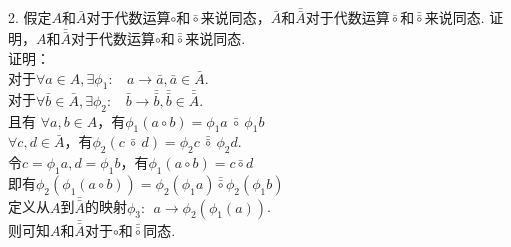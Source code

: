 \documentclass{ctexart}
\begin{document}
2. 假定$A$和$\bar{A}$对于代数运算$\circ$和$\bar{\circ}$来说同态，$\bar{A}$和$\bar{\bar{A}}$对于代数运算$\bar{\circ}$和$\bar{\bar{\circ}}$来说同态. 证明，$A$和$\bar{\bar{A}}$对于代数运算$\circ$和$\bar{\bar{\circ}}$来说同态. \\
证明：\\
对于$\forall a \in A, \exists \phi_1: \ \ \ \ a \rightarrow \bar{a}, \bar{a} \in \bar{A}.$ \\
对于$\forall \bar{b} \in \bar{A}, \exists \phi_2: \ \ \ \ \bar{b} \rightarrow \bar{\bar{b}}, \bar{\bar{b}} \in \bar{\bar{A}}.$ \\
且有 $\forall a,b \in A$，有$\phi_1(a \circ b) = \phi_1 a \ \bar{\circ} \  \phi_1 b$\\
 $\forall c,d \in \bar{A}$，有$\phi_2(c \ \bar{\circ} \ d) = \phi_2 c \  \bar{\bar{\circ}} \ \phi_2 d$. \\
令$c = \phi_1 a , d = \phi_1 b$，有$\phi_1 (a \circ b) = c \bar{\circ} d$ \\
即有$\phi_2(\phi_1(a \circ b)) = \phi_2 (\phi_1 a) \bar{\bar{\circ}} \phi_2(\phi_1 b)$ \\
定义从$A$到$\bar{\bar{A}}$的映射$\phi_3: \ \ a \rightarrow \phi_2(\phi_1(a))$. \\
则可知$A$和$\bar{\bar{A}}$对于$\circ$和$\bar{\bar{\circ}}$同态.
\end{document}
